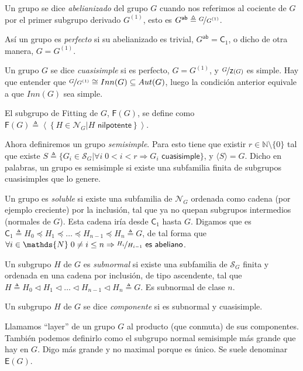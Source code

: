 \documentclass[12pt,a4paper,fleqn,spanish,final,openright]{extbook}
\theoremstyle{definition}
\theoremstyle{remark}
\begin{document}
Un grupo se dice \emph{abelianizado} del grupo $G$ cuando nos referimos al cociente
de $G$ por el primer subgrupo derivado $G^{(1)}$, esto es
$G^{\textsf{ab}}\triangleq \nicefrac{G}{G^{(1)}}$.

Así un grupo es \emph{perfecto} si su abelianizado es trivial,
$G^{\textsf{ab}} = \mathsf{C}_1$, o dicho de otra manera,
$G = G^{(1)}$.

Un grupo $G$ se dice \emph{cuasisimple} si es perfecto, $G = G^{(1)}$, y
$\nicefrac{G}{\mathsf{Z}(G)}$ es simple. Hay que entender que
$\nicefrac{G}{G^{(1)}}    \cong    Inn(G)    \subseteq Aut(G)$, luego la condición
anterior equivale a que $Inn(G)$ sea simple.

El subgrupo de Fitting de $G$, $\mathsf{F}(G)$, se define como
$\mathsf{F}(G) \triangleq \left\langle{\left\lbrace{H    \in \mathcal{N}_G \vert
H \textsf{ nilpotente}}\right\rbrace}\right\rangle$.

Ahora definiremos un grupo \emph{semisimple}. Para esto tiene que existir
$r    \in \mathds{N}\setminus\lbrace 0 \rbrace$ tal que existe
$S\triangleq \lbrace{G_i    \in \mathcal{S}_G \vert
\forall i\; 0<i<r    \Rightarrow    G_i \textsf{ cuasisimple}}\rbrace$,
y $\langle S \rangle = G$. Dicho en palabras, un grupo es semisimple si existe
una subfamilia finita de subgrupos cuasisimples que lo genere.

Un grupo es \emph{soluble} si existe una subfamilia de $\mathcal{N}_G$ ordenada
como cadena (por ejemplo creciente) por la inclusión, tal que ya no quepan
subgrupos intermedios (normales de $G$). Esta cadena iría desde
$\mathsf{C}_{1}$ hasta $G$. Digamos que es
$\mathsf{C}_{1}\triangleq H_0    \preccurlyeq    H_1    \preccurlyeq    \ldots
   \preccurlyeq    H_{n-1}    \preccurlyeq    H_n \triangleq G$, de tal forma que
$\forall i    \in \mathds{N}\;0    \neq    i\leq n    \Rightarrow
\nicefrac{H_i}{H_{i-1}} \textsf{ es abeliano}$.

Un subgrupo $H$ de $G$ es \emph{subnormal} si existe una subfamilia de $\mathcal{S}_{G}$
finita y ordenada en una cadena por inclusión, de tipo ascendente, tal que
$H\triangleq H_0 \lhd H_1 \lhd \ldots \lhd H_{n-1} \lhd H_n \triangleq G$.
Es subnormal de clase $n$.

Un subgrupo $H$ de $G$ se dice \emph{componente} si es subnormal y cuasisimple.

Llamamos ``layer'' de un grupo $G$ al producto (que conmuta) de sus componentes.
También podemos definirlo como el subgrupo normal semisimple más grande que hay en $G$.
Digo más grande y no maximal porque es único. Se suele denominar $\mathsf{E}(G)$.
\end{document}
